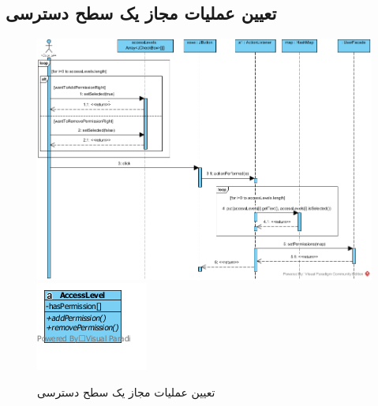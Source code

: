 \begin{landscape}
\newpage
\section{تعیین عملیات مجاز یک سطح دسترسی}
\begin{figure}[H]
	\centering
	\includegraphics[scale=0.7]{img/sequence-design/SetPermissions}
	\includegraphics[scale=0.7]{img/sequence-design/SetPermissionsC}
	\caption{تعیین عملیات مجاز یک سطح دسترسی}
\end{figure}

\newpage

\end{landscape}
